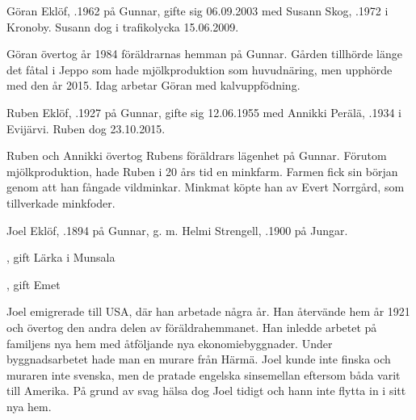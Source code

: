
Göran Eklöf, .1962 på Gunnar, gifte sig 06.09.2003 med Susann Skog, .1972 i Kronoby. Susann dog i trafikolycka 15.06.2009.
\begin{jhchildren}
  \item {}
  \item {}
\end{jhchildren}
Göran övertog år 1984  föräldrarnas hemman på Gunnar. Gården tillhörde länge det fåtal i Jeppo som hade mjölkproduktion som huvudnäring, men upphörde med den år 2015. Idag arbetar Göran med kalvuppfödning.


Ruben Eklöf,  .1927 på Gunnar, gifte sig 12.06.1955 med Annikki  Perälä,  .1934 i Evijärvi. Ruben dog 23.10.2015.
\begin{jhchildren}
  \item {}
  \item {}
\end{jhchildren}
Ruben och Annikki övertog Rubens föräldrars lägenhet på Gunnar. Förutom mjölkproduktion, hade Ruben i 20 års tid en minkfarm. Farmen fick sin början genom att han fångade vildminkar. Minkmat köpte han av Evert Norrgård, som tillverkade minkfoder.


Joel Eklöf, .1894 på Gunnar, g. m. Helmi Strengell, .1900 på Jungar.
\begin{jhchildren}
  \item {}, gift Lärka i Munsala
  \item {}
  \item {}, gift Emet
\end{jhchildren}
Joel emigrerade till USA, där han arbetade några år. Han återvände hem år 1921 och övertog den andra delen av föräldrahemmanet. Han inledde arbetet på familjens nya hem med åtföljande nya ekonomiebyggnader. Under byggnadsarbetet hade man en murare från Härmä. Joel kunde inte finska och muraren inte svenska, men de pratade engelska sinsemellan eftersom båda varit till Amerika. På grund av svag hälsa dog Joel tidigt och hann inte flytta in i sitt nya hem.

